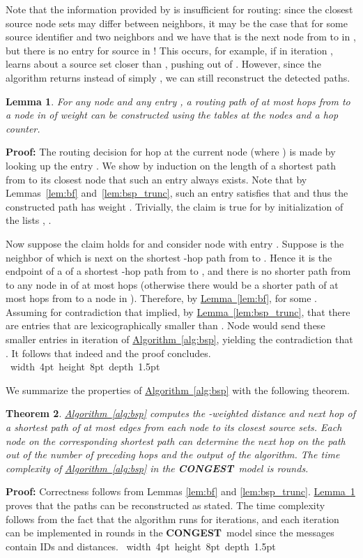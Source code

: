 \documentclass[letterpaper,11pt]{article}
\newcommand{\namedref}[2]{\hyperref[#2]{#1~\ref*{#2}}}
\newcommand{\lemmaref}[1]{\namedref{Lemma}{#1}}
\newcommand{\algref}[1]{\namedref{Algorithm}{#1}}
\newtheorem{theorem}{Theorem}[section]
\newtheorem{lemma}[theorem]{Lemma}
\newcommand{\blackslug}{\hbox{\hskip 1pt \vrule width 4pt height 8pt
depth 1.5pt \hskip 1pt}}
\newcommand{\QED}{\quad\blackslug\lower 8.5pt\null\par}
\newenvironment{proof}[1][Proof:]{\noindent \textbf{#1}\xspace}{\QED}
\newcommand{\CONGEST}{\textbf{CONGEST}}
\begin{document}
Note that the information provided by  is insufficient for routing:
since the  closest source node sets may differ between neighbors, it
may be the case that for some source identifier  and two neighbors  and
 we have that  is the next node from  to  in , but there is
no entry for source  in ! This occurs, for example, if in  iteration
,  learns about a source set closer than , pushing  out of
. However, since the algorithm returns  instead of
simply , we can still reconstruct the detected paths.
\begin{lemma}\label{lemma:bsp_route_stateful}
For any node  and any entry , a routing path of at
most  hops from  to a node in  of weight  can be constructed using
the  tables at the nodes and a hop counter.
\end{lemma}
\begin{proof}
The routing decision for hop  at the current node  (where )
is made by looking up the entry . We show by
induction on the length  of a shortest path from  to its closest
node  that such an entry always exists. Note that by
Lemmas~\ref{lem:bf} and~\ref{lem:bsp_trunc}, such an entry satisfies that
 and thus the constructed path has weight
. Trivially, the claim is true for  by initialization of
the lists , .

Now suppose the claim holds for  and consider node  with entry
. Suppose  is the neighbor of  which is next
on the shortest -hop path from  to . Hence it is the endpoint of a
of a shortest -hop path from  to , and there is no shorter path
from  to any node in  of at most  hops (otherwise there would
be a shorter path of at most  hops from  to a node in ).
Therefore, by \lemmaref{lem:bf},  for
some . Assuming for contradiction that
 implied, by
\lemmaref{lem:bsp_trunc}, that there are  entries  that are lexicographically smaller than .
Node  would send these smaller entries in iteration  of \algref{alg:bsp},
yielding the contradiction that . It follows
that indeed  and the proof concludes.
\end{proof}

We summarize the properties of \algref{alg:bsp} with the following
theorem. 
\begin{theorem}\label{thm:bsp}
\algref{alg:bsp} computes the -weighted distance and next hop of a shortest
path of at most  edges from each node to its closest  source sets.
Each node on the corresponding shortest path can determine the next hop on the
path out of the number of preceding hops and the output of the algorithm.
The time complexity of \algref{alg:bsp} in the \CONGEST\ model is  rounds.
\end{theorem}
\begin{proof}
Correctness follows from Lemmas \ref{lem:bf} and \ref{lem:bsp_trunc}.
\lemmaref{lemma:bsp_route_stateful} proves that the paths can be reconstructed
as stated. The time complexity follows from the fact that the algorithm runs for
 iterations, and each iteration can be implemented  in  rounds
in the \CONGEST\ model since the messages contain  IDs and
distances.
\end{proof}
\end{document}

